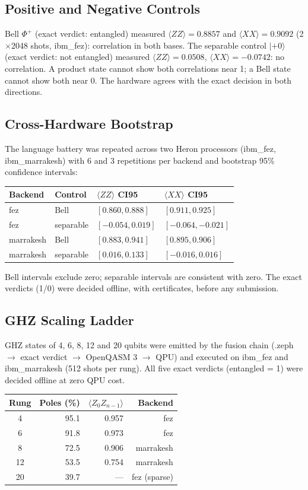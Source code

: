 \documentclass[11pt]{article}
\begin{document}
\subsection{Positive and Negative Controls}
Bell $\Phi^+$ (exact verdict: entangled) measured
$\langle ZZ\rangle = 0.8857$ and $\langle XX\rangle = 0.9092$
(2$\times$2048 shots, ibm\_fez): correlation in both bases. The
separable control $|+0\rangle$ (exact verdict: not entangled) measured
$\langle ZZ\rangle = 0.0508$, $\langle XX\rangle = -0.0742$: no
correlation. A product state cannot show both correlations near 1; a
Bell state cannot show both near 0. The hardware agrees with the exact
decision in both directions.

\subsection{Cross-Hardware Bootstrap}
The language battery was repeated across two Heron processors
(ibm\_fez, ibm\_marrakesh) with 6 and 3 repetitions per backend and
bootstrap 95\% confidence intervals:
\begin{center}
\begin{tabular}{llll}
\toprule
Backend & Control & $\langle ZZ\rangle$ CI95 & $\langle XX\rangle$ CI95 \\
\midrule
fez & Bell & $[0.860, 0.888]$ & $[0.911, 0.925]$ \\
fez & separable & $[-0.054, 0.019]$ & $[-0.064, -0.021]$ \\
marrakesh & Bell & $[0.883, 0.941]$ & $[0.895, 0.906]$ \\
marrakesh & separable & $[0.016, 0.133]$ & $[-0.016, 0.016]$ \\
\bottomrule
\end{tabular}
\end{center}
Bell intervals exclude zero; separable intervals are consistent with
zero. The exact verdicts (1/0) were decided offline, with certificates,
before any submission.

\subsection{GHZ Scaling Ladder}
GHZ states of 4, 6, 8, 12 and 20 qubits were emitted by the fusion chain
(.zeph $\rightarrow$ exact verdict $\rightarrow$ OpenQASM 3
$\rightarrow$ QPU) and executed on ibm\_fez and ibm\_marrakesh
(512 shots per rung). All five exact verdicts (entangled = 1) were
decided offline at zero QPU cost.

\begin{center}
\begin{tabular}{crrr}
\toprule
Rung & Poles (\%) & $\langle Z_0 Z_{n-1}\rangle$ & Backend \\
\midrule
4 & 95.1 & 0.957 & fez \\
6 & 91.8 & 0.973 & fez \\
8 & 72.5 & 0.906 & marrakesh \\
12 & 53.5 & 0.754 & marrakesh \\
20 & 39.7 & --- & fez (sparse) \\
\bottomrule
\end{tabular}
\end{center}
\end{document}
